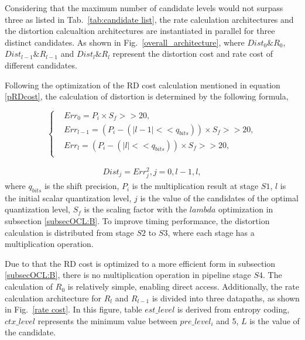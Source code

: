 \documentclass[lettersize,journal]{IEEEtran}
\begin{document}
Considering that the maximum number of candidate levels would not surpass three as listed in Tab.~\ref{tab:candidate list}, the rate calculation architectures and the distortion calcualtion architectures are instantiated in parallel for three distinct candidates. As shown in Fig.~\ref{overall_architecture}, where $Dist_{0}\&R_{0}$, $Dist_{l-1}\&R_{l-1}$ and $Dist_{l}\&R_{l}$ represent the distortion cost and rate cost of different candidates. 

Following the optimization of the RD cost calculation mentioned in equation \ref{pRDcost}, the calculation of distortion is determined by the following formula,

\begin{equation}\label{err}
	\left\{
		\begin{aligned}
			&Err_{0} 	=  P_{i} \times S_f >> 20,  \\
			&Err_{l-1} 	= \left ( P_{i} - \left ( \lvert l-1 \rvert << q_{bits} \right ) \right ) \times S_f >> 20,  \\
			&Err_{l} 	= \left ( P_{i} - \left ( \lvert l \rvert << q_{bits} \right ) \right ) \times S_f >> 20,  \\ 
		\end{aligned}
	\right.
\end{equation}

\begin{equation}\label{distortion}
	\begin{aligned}
		Dist_{j} = Err_{j}^{2}, j = 0, l-1, l,
	\end{aligned}
\end{equation}
where $q_{bits}$ is the shift precision, $P_{i}$ is the multiplication result at stage $S1$, $l$ is the initial scalar quantization level, $j$ is the value of the candidates of the optimal quantization level, $S_f$ is the scaling factor with the $lambda$ optimization in subsection \ref{subsecOCL:B}. To improve timing performance, the distortion calculation is distributed from stage $S2$ to $S3$, where each stage has a multiplication operation.

Due to that the RD cost is optimized to a more efficient form in subsection \ref{subsecOCL:B}, there is no multiplication operation in pipeline stage $S4$. The calculation of $R_{0}$ is relatively simple, enabling direct access. Additionally, the rate calculation architecture for $R_{l}$ and $R_{l-1}$ is divided into three datapaths, as shown in Fig.~\ref{rate cost}. 
In this figure, table $est\_level$ is derived from entropy coding, $ctx\_level$ represents the minimum value between $pre\_level_i$ and 5, $L$ is the value of the candidate.
\end{document}
